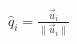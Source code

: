 \documentclass[preview]{standalone}
\begin{document}
\begin{align*}
\hat{q}_i = \frac{\vec{u}_i}{\|\vec{u}_i\|}
\end{align*}
\end{document}
